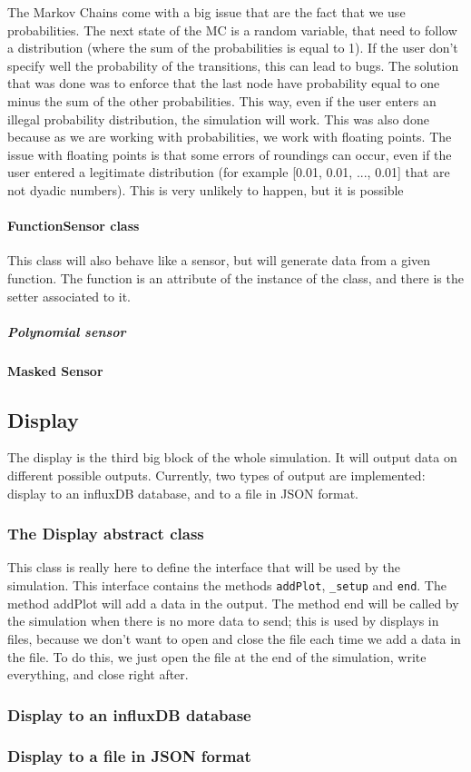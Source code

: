 The Markov Chains come with a big issue that are the fact that we use probabilities. The next state of the MC is a random variable, that need to follow a distribution (where the sum of the probabilities is equal to 1). If the user don't specify well the probability of the transitions, this can lead to bugs. The solution that was done was to enforce that the last node have probability equal to one minus the sum of the other probabilities. This way, even if the user enters an illegal probability distribution, the simulation will work.
This was also done because as we are working with probabilities, we work with floating points. The issue with floating points is that some errors of roundings can occur, even if the user entered a legitimate distribution (for example [0.01, 0.01, ..., 0.01] that are not dyadic numbers). This is very unlikely to happen, but it is possible

\paragraph{FunctionSensor class}

This class will also behave like a sensor, but will generate data from a given function. The function is an attribute of the instance of the class, and there is the setter associated to it.

\subparagraph{Polynomial sensor}

\paragraph{Masked Sensor}



\subsection{Display}

The display is the third big block of the whole simulation. It will output data on different possible outputs. Currently, two types of output are implemented: display to an influxDB database, and to a file in JSON format.

\subsubsection{The Display abstract class}

This class is really here to define the interface that will be used by the simulation. This interface contains the methods \verb!addPlot!, \verb!_setup! and \verb!end!. The method addPlot will add a data in the output. The method end will be called by the simulation when there is no more data to send; this is used by displays in files, because we don't want to open and close the file each time we add a data in the file. To do this, we just open the file at the end of the simulation, write everything, and close right after.

\subsubsection{Display to an influxDB database}

\subsubsection{Display to a file in JSON format}
